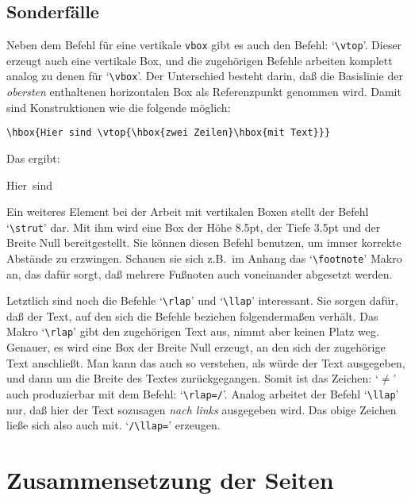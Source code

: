 \section{Sonderf\"alle}
Neben dem Befehl f\"ur eine vertikale 
{\tt vbox} gibt es auch den
Befehl: 
`\verb|\vtop|'. Dieser erzeugt auch eine vertikale Box, und
die zugeh\"origen Befehle arbeiten komplett analog zu denen f\"ur
`\verb|\vbox|'. Der Unterschied besteht darin, da\ss{} die Basislinie der
{\em obersten} enthaltenen horizontalen Box als Referenzpunkt genommen
wird. Damit sind Konstruktionen wie die folgende m\"oglich:
\begin{verbatim}
\hbox{Hier sind \vtop{\hbox{zwei Zeilen}\hbox{mit Text}}}
\end{verbatim}
Das ergibt:\medskip

\hbox{Hier sind }\medskip

Ein weiteres Element bei der Arbeit mit vertikalen Boxen stellt der
Befehl 
`\verb|\strut|' dar. Mit ihm wird eine Box der
H\"ohe 8.5pt, der
Tiefe 3.5pt und der Breite Null bereitgestellt. Sie k\"onnen diesen
Befehl benutzen, um immer korrekte Abst\"ande zu erzwingen. Schauen sie
sich z.B.\ im Anhang das `\verb|\footnote|' Makro an, das daf\"ur sorgt,
da\ss{} mehrere 
Fu\ss{}noten auch voneinander abgesetzt werden.

Letztlich sind noch die Befehle 
`\verb|\rlap|' und
`\verb|\llap|'
interessant. Sie sorgen daf\"ur, da\ss{} der Text, auf den sich die Befehle
beziehen folgenderma\ss{}en verh\"alt. Das Makro `\verb|\rlap|' gibt den
zugeh\"origen Text aus, nimmt aber keinen Platz weg. Genauer, es wird
eine Box der Breite Null erzeugt, an den sich der zugeh\"orige Text
anschlie\ss{}t. Man kann das auch so verstehen, als w\"urde der Text
ausgegeben, und dann um die Breite des Textes zur\"uckgegangen. Somit
ist das Zeichen: `$\neq$' auch produzierbar mit dem Befehl:
`\verb|\rlap=/|'. Analog arbeitet der Befehl `\verb|\llap|' nur, da\ss{}
hier der Text sozusagen {\em nach links} ausgegeben wird. Das obige
Zeichen lie\ss{}e sich also auch mit. `\verb|/\llap=|' erzeugen.
\chapter{Zusammensetzung der Seiten}
